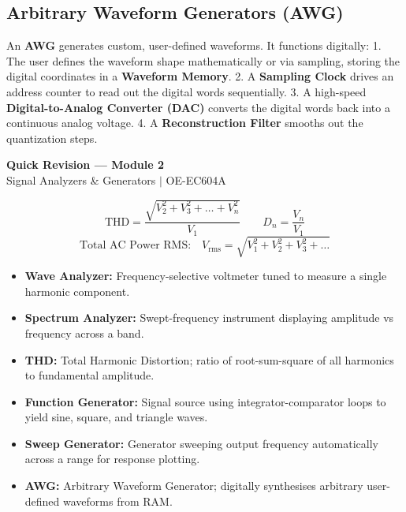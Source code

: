 \documentclass[12pt,a4paper]{article}
\begin{document}
\subsection{Arbitrary Waveform Generators (AWG)}
An \textbf{AWG} generates custom, user-defined waveforms. It functions digitally:
1. The user defines the waveform shape mathematically or via sampling, storing the digital coordinates in a \textbf{Waveform Memory}.
2. A \textbf{Sampling Clock} drives an address counter to read out the digital words sequentially.
3. A high-speed \textbf{Digital-to-Analog Converter (DAC)} converts the digital words back into a continuous analog voltage.
4. A \textbf{Reconstruction Filter} smooths out the quantization steps.

\newpage
\begin{center}
  {\large\bfseries\color{myred} Quick Revision --- Module 2}\\[3pt]
  {\small\color{mydark} Signal Analyzers \& Generators $|$ OE-EC604A}
\end{center}
\noindent{\color{myred}\rule{\linewidth}{1.2pt}}
\vspace{4pt}

\begin{tcolorbox}[formulabox, title={\textbf{Key Distortion Formula}}]
$$\text{THD} = \frac{\sqrt{V_2^2 + V_3^2 + \dots + V_n^2}}{V_1} \qquad D_n = \frac{V_n}{V_1}$$
$$\text{Total AC Power RMS:} \quad V_{\text{rms}} = \sqrt{V_1^2 + V_2^2 + V_3^2 + \dots}$$
\end{tcolorbox}

\begin{tcolorbox}[defbox, title={\textbf{One-Line Definitions}}]
\begin{itemize}[leftmargin=*, itemsep=2.5pt, topsep=0pt]
  \item \textbf{Wave Analyzer:} Frequency-selective voltmeter tuned to measure a single harmonic component.
  \item \textbf{Spectrum Analyzer:} Swept-frequency instrument displaying amplitude vs frequency across a band.
  \item \textbf{THD:} Total Harmonic Distortion; ratio of root-sum-square of all harmonics to fundamental amplitude.
  \item \textbf{Function Generator:} Signal source using integrator-comparator loops to yield sine, square, and triangle waves.
  \item \textbf{Sweep Generator:} Generator sweeping output frequency automatically across a range for response plotting.
  \item \textbf{AWG:} Arbitrary Waveform Generator; digitally synthesises arbitrary user-defined waveforms from RAM.
\end{itemize}
\end{tcolorbox}
\end{document}

